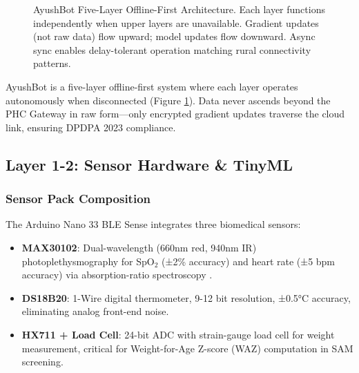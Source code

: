 \documentclass[conference,compsoc]{IEEEtran}
\begin{document}
\begin{figure}[t]
    \caption{AyushBot Five-Layer Offline-First Architecture. Each layer functions independently when upper layers are unavailable. Gradient updates (not raw data) flow upward; model updates flow downward. Async sync enables delay-tolerant operation matching rural connectivity patterns.}
    \label{fig:architecture}
\end{figure}

AyushBot is a five-layer offline-first system where each layer operates autonomously when disconnected (Figure \ref{fig:architecture}). Data never ascends beyond the PHC Gateway in raw form—only encrypted gradient updates traverse the cloud link, ensuring DPDPA 2023 compliance.

\subsection{Layer 1-2: Sensor Hardware \& TinyML}

\subsubsection{Sensor Pack Composition}
The Arduino Nano 33 BLE Sense integrates three biomedical sensors:
\begin{itemize}
    \item \textbf{MAX30102}: Dual-wavelength (660nm red, 940nm IR) photoplethysmography for SpO\(_2\) (±2\% accuracy) and heart rate (±5 bpm accuracy) via absorption-ratio spectroscopy \cite{max30102_datasheet}.
    \item \textbf{DS18B20}: 1-Wire digital thermometer, 9-12 bit resolution, ±0.5°C accuracy, eliminating analog front-end noise.
    \item \textbf{HX711 + Load Cell}: 24-bit ADC with strain-gauge load cell for weight measurement, critical for Weight-for-Age Z-score (WAZ) computation in SAM screening.
\end{itemize}
\end{document}
